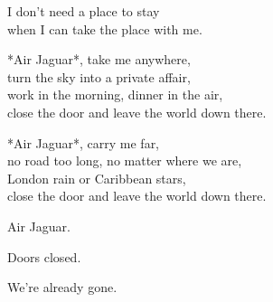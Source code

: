 \begin{lyrics}
I don't need a place to stay\\
when I can take the place with me.



*Air Jaguar*, take me anywhere,\\
turn the sky into a private affair,\\
work in the morning, dinner in the air,\\
close the door and leave the world down there.

*Air Jaguar*, carry me far,\\
no road too long, no matter where we are,\\
London rain or Caribbean stars,\\
close the door and leave the world down there.


Air Jaguar.

Doors closed.

We're already gone.
\end{lyrics}

